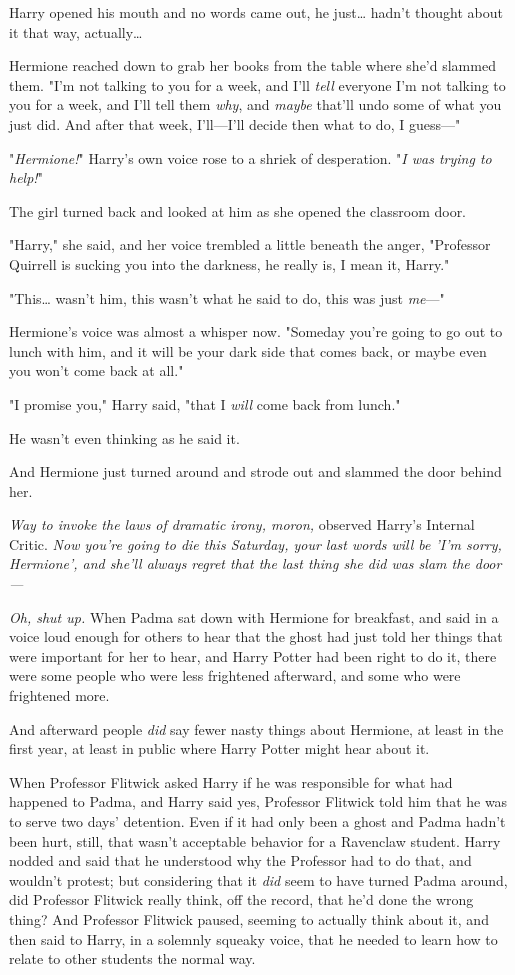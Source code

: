 Harry opened his mouth and no words came out, he just{\ldots} hadn't thought 
about it that way, actually{\ldots}

Hermione reached down to grab her books from the table where she'd slammed 
them. "I'm not talking to you for a week, and I'll \emph{tell} everyone I'm not 
talking to you for a week, and I'll tell them \emph{why}, and \emph{maybe} 
that'll undo some of what you just did. And after that week, I'll---I'll decide 
then what to do, I guess---"

"\emph{Hermione!}" Harry's own voice rose to a shriek of desperation. "\emph{I 
was trying to help!}"

The girl turned back and looked at him as she opened the classroom door.

"Harry," she said, and her voice trembled a little beneath the anger, 
"Professor Quirrell is sucking you into the darkness, he really is, I mean it, 
Harry."

"This{\ldots} wasn't him, this wasn't what he said to do, this was just 
\emph{me}---"

Hermione's voice was almost a whisper now. "Someday you're going to go out to 
lunch with him, and it will be your dark side that comes back, or maybe even 
you won't come back at all."

"I promise you," Harry said, "that I \emph{will} come back from lunch."

He wasn't even thinking as he said it.

And Hermione just turned around and strode out and slammed the door behind her.

\emph{Way to invoke the laws of dramatic irony, moron,} observed Harry's 
Internal Critic. \emph{Now you're going to die this Saturday, your last words 
will be 'I'm sorry, Hermione', and she'll always regret that the last thing she 
did was slam the door---}

\emph{Oh, shut up.}
\sbreak
When Padma sat down with Hermione for breakfast, and said in a voice loud 
enough for others to hear that the ghost had just told her things that were 
important for her to hear, and Harry Potter had been right to do it, there were 
some people who were less frightened afterward, and some who were frightened 
more.

And afterward people \emph{did} say fewer nasty things about Hermione, at least 
in the first year, at least in public where Harry Potter might hear about it.

When Professor Flitwick asked Harry if he was responsible for what had happened 
to Padma, and Harry said yes, Professor Flitwick told him that he was to serve 
two days' detention. Even if it had only been a ghost and Padma hadn't been 
hurt, still, that wasn't acceptable behavior for a Ravenclaw student. Harry 
nodded and said that he understood why the Professor had to do that, and 
wouldn't protest; but considering that it \emph{did} seem to have turned Padma 
around, did Professor Flitwick really think, off the record, that he'd done the 
wrong thing? And Professor Flitwick paused, seeming to actually think about it, 
and then said to Harry, in a solemnly squeaky voice, that he needed to learn 
how to relate to other students the normal way.


